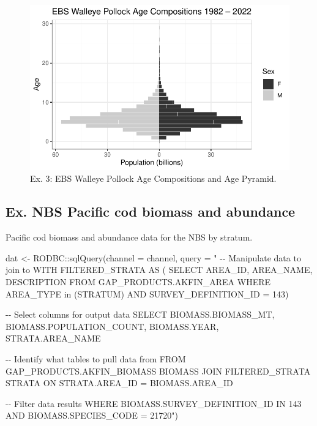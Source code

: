 \documentclass[
  letterpaper,
  oneside,
  open=any]{scrbook}
\newenvironment{Shaded}{\begin{snugshade}}{\end{snugshade}}
\newcommand{\AttributeTok}[1]{\textcolor[rgb]{0.40,0.45,0.13}{#1}}
\newcommand{\FunctionTok}[1]{\textcolor[rgb]{0.28,0.35,0.67}{#1}}
\newcommand{\NormalTok}[1]{\textcolor[rgb]{0.00,0.23,0.31}{#1}}
\newcommand{\OtherTok}[1]{\textcolor[rgb]{0.00,0.23,0.31}{#1}}
\newcommand{\SpecialCharTok}[1]{\textcolor[rgb]{0.37,0.37,0.37}{#1}}
\newcommand{\StringTok}[1]{\textcolor[rgb]{0.13,0.47,0.30}{#1}}
\begin{document}
\begin{figure}[H]

{\centering \includegraphics{content/akfin-oracle-sql-r_files/figure-pdf/test-3-plot-1.pdf}

}

\caption{Ex. 3: EBS Walleye Pollock Age Compositions and Age Pyramid.}

\end{figure}

\hypertarget{ex.-nbs-pacific-cod-biomass-and-abundance}{%
\subsection{Ex. NBS Pacific cod biomass and
abundance}\label{ex.-nbs-pacific-cod-biomass-and-abundance}}

Pacific cod biomass and abundance data for the NBS by stratum.

\begin{Shaded}
\begin{Highlighting}[]
\NormalTok{dat }\OtherTok{\textless{}{-}}\NormalTok{ RODBC}\SpecialCharTok{::}\FunctionTok{sqlQuery}\NormalTok{(}\AttributeTok{channel =}\NormalTok{ channel, }
                       \AttributeTok{query =} 
                         \StringTok{"}
\StringTok{{-}{-} Manipulate data to join to}
\StringTok{WITH FILTERED\_STRATA AS (}
\StringTok{SELECT }
\StringTok{AREA\_ID, }
\StringTok{AREA\_NAME, }
\StringTok{DESCRIPTION }
\StringTok{FROM GAP\_PRODUCTS.AKFIN\_AREA}
\StringTok{WHERE AREA\_TYPE in (\textquotesingle{}STRATUM\textquotesingle{}) AND }
\StringTok{SURVEY\_DEFINITION\_ID = 143) }

\StringTok{{-}{-} Select columns for output data}
\StringTok{SELECT }
\StringTok{BIOMASS.BIOMASS\_MT, }
\StringTok{BIOMASS.POPULATION\_COUNT, }
\StringTok{BIOMASS.YEAR, }
\StringTok{STRATA.AREA\_NAME}

\StringTok{{-}{-} Identify what tables to pull data from}
\StringTok{FROM GAP\_PRODUCTS.AKFIN\_BIOMASS BIOMASS }
\StringTok{JOIN FILTERED\_STRATA STRATA }
\StringTok{ON STRATA.AREA\_ID = BIOMASS.AREA\_ID}

\StringTok{{-}{-} Filter data results}
\StringTok{WHERE BIOMASS.SURVEY\_DEFINITION\_ID IN 143 }
\StringTok{AND BIOMASS.SPECIES\_CODE = 21720"}\NormalTok{)}
\end{Highlighting}
\end{Shaded}
\end{document}
